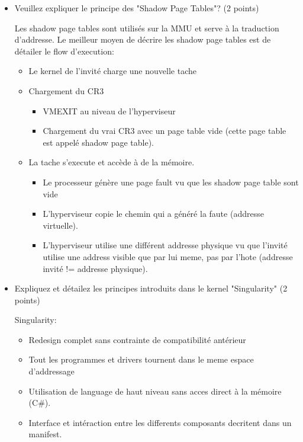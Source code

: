 \begin{correction}

\begin{itemize}
    \item
        Veuillez expliquer le principe des "Shadow Page Tables"? (2 points)

        Les shadow page tables sont utilis\'es sur la MMU et serve \`a la traduction
        d'addresse. Le meilleur moyen de d\'ecrire les shadow page tables est de d\'etailer
        le flow d'execution:
        \begin{itemize}
            \item Le kernel de l'invit\'e charge une nouvelle tache
            \item Chargement du CR3
                \begin{itemize}
                    \item VMEXIT au niveau de l'hyperviseur
                    \item Chargement du vrai CR3 avec un page table vide (cette page table est appel\'e
                  shadow page table).
                \end{itemize}
            \item La tache s'execute et acc\`ede \`a de la m\'emoire.
            \begin{itemize}
                \item Le processeur g\'en\`ere une page fault vu que les shadow page table sont vide
                \item L'hyperviseur copie le chemin qui a g\'en\'er\'e la faute (addresse virtuelle).
                \item L'hyperviseur utilise une diff\'erent addresse physique vu que l'invit\'e utilise
                  une address visible que par lui meme, pas par l'hote (addresse invit\'e != addresse physique).
            \end{itemize}
        \end{itemize}
    \item
        Expliquez et d\'etailez les principes introduits dans le kernel "Singularity" (2 points)

        Singularity:
        \begin{itemize}
            \item Redesign complet sans contrainte de compatibilit\'e ant\'erieur
            \item Tout les programmes et drivers tournent dans le meme espace d'addressage
            \item Utilisation de language de haut niveau sans acces direct \`a la m\'emoire (C\#).
            \item Interface et int\'eraction entre les differents composants decritent dans un
            manifest.
        \end{itemize}
            
\end{itemize}

\end{correction}

